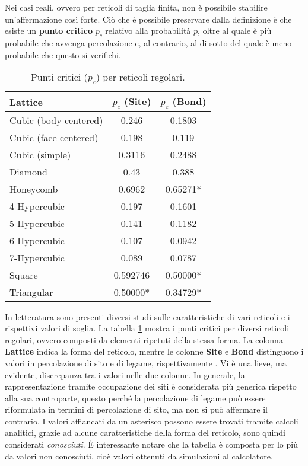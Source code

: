 Nei casi reali, ovvero per reticoli di taglia finita, non è possibile stabilire
un'affermazione così forte. 
Ciò che è possibile preservare dalla definizione 
è che esiste un \textbf{punto critico} $p_c$ relativo alla probabilità $p$, oltre 
al quale è più probabile che avvenga percolazione e, al contrario, al di sotto
del quale è meno probabile che questo si verifichi.

\begin{table}[ht!]
    \centering
    \begin{tabular}{lcc}
    \toprule
    \textbf{Lattice} & \textbf{\(p_c\) (Site)} & \textbf{\(p_c\) (Bond)} \\
    \midrule
    Cubic (body-centered) & 0.246    & 0.1803    \\
    Cubic (face-centered) & 0.198    & 0.119     \\
    Cubic (simple)        & 0.3116   & 0.2488    \\
    Diamond               & 0.43     & 0.388     \\
    Honeycomb             & 0.6962   & 0.65271*  \\
    4-Hypercubic          & 0.197    & 0.1601    \\
    5-Hypercubic          & 0.141    & 0.1182    \\
    6-Hypercubic          & 0.107    & 0.0942    \\
    7-Hypercubic          & 0.089    & 0.0787    \\
    Square                & 0.592746 & 0.50000*  \\
    Triangular            & 0.50000* & 0.34729*  \\
    \bottomrule
    \end{tabular}
    \caption{Punti critici (\(p_c\)) per reticoli regolari.}
    \label{tab:percolation}
\end{table}

In letteratura sono presenti diversi studi sulle caratteristiche di vari 
reticoli e i rispettivi valori di soglia. La tabella \ref{tab:percolation}
mostra i punti critici per diversi reticoli regolari, ovvero composti
da elementi ripetuti della stessa forma. La colonna \textbf{Lattice} indica la forma 
del reticolo, mentre le colonne \textbf{Site} e \textbf{Bond} distinguono i valori 
in percolazione di sito e di legame, rispettivamente \cite{stauffer-threshold}.
Vi è una lieve, ma evidente, discrepanza tra i valori nelle due colonne.
In generale, la rappresentazione tramite occupazione dei siti è considerata
più generica rispetto alla sua controparte, questo perché la percolazione di legame
può essere riformulata in termini di percolazione di sito, 
ma non si può affermare il contrario.
I valori affiancati da un asterisco possono essere trovati tramite calcoli analitici,
grazie ad alcune caratteristiche della forma del reticolo,
sono quindi considerati \textit{conosciuti}. È interessante notare che la 
tabella è composta per lo più da valori non conosciuti, cioè valori ottenuti da 
simulazioni al calcolatore.

